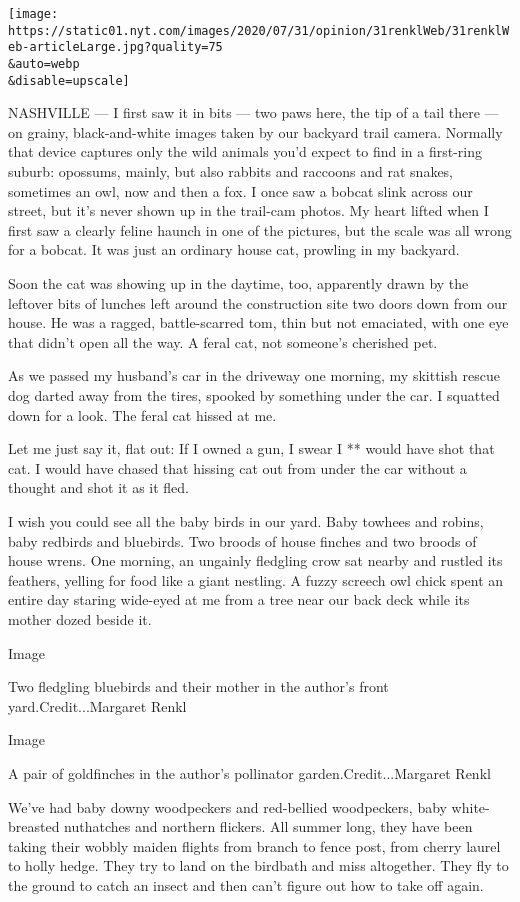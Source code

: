\texttt{[image: https://static01.nyt.com/images/2020/07/31/opinion/31renklWeb/31renklWeb-articleLarge.jpg?quality=75\\\&auto=webp\\\&disable=upscale]}

NASHVILLE --- I first saw it in bits --- two paws here, the tip of a
tail there --- on grainy, black-and-white images taken by our backyard
trail camera. Normally that device captures only the wild animals you'd
expect to find in a first-ring suburb: opossums, mainly, but also
rabbits and raccoons and rat snakes, sometimes an owl, now and then a
fox. I once saw a bobcat slink across our street, but it's never shown
up in the trail-cam photos. My heart lifted when I first saw a clearly
feline haunch in one of the pictures, but the scale was all wrong for a
bobcat. It was just an ordinary house cat, prowling in my backyard.

Soon the cat was showing up in the daytime, too, apparently drawn by the
leftover bits of lunches left around the construction site two doors
down from our house. He was a ragged, battle-scarred tom, thin but not
emaciated, with one eye that didn't open all the way. A feral cat, not
someone's cherished pet.

As we passed my husband's car in the driveway one morning, my skittish
rescue dog darted away from the tires, spooked by something under the
car. I squatted down for a look. The feral cat hissed at me.

Let me just say it, flat out: If I owned a gun, I swear I ** would have
shot that cat. I would have chased that hissing cat out from under the
car without a thought and shot it as it fled.

I wish you could see all the baby birds in our yard. Baby towhees and
robins, baby redbirds and bluebirds. Two broods of house finches and two
broods of house wrens. One morning, an ungainly fledgling crow sat
nearby and rustled its feathers, yelling for food like a giant nestling.
A fuzzy screech owl chick spent an entire day staring wide-eyed at me
from a tree near our back deck while its mother dozed beside it.

Image

Two fledgling bluebirds and their mother in the author's front
yard.Credit...Margaret Renkl

Image

A pair of goldfinches in the author's pollinator
garden.Credit...Margaret Renkl

We've had baby downy woodpeckers and red-bellied woodpeckers, baby
white-breasted nuthatches and northern flickers. All summer long, they
have been taking their wobbly maiden flights from branch to fence post,
from cherry laurel to holly hedge. They try to land on the birdbath and
miss altogether. They fly to the ground to catch an insect and then
can't figure out how to take off again.

